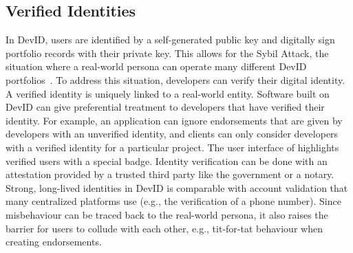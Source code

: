\subsection{Verified Identities}
\label{subsec:strong_identities}
In DevID, users are identified by a self-generated public key and digitally sign portfolio records with their private key.
This allows for the Sybil Attack, the situation where a real-world persona can operate many different DevID portfolios~\cite{douceur2002sybil}.
To address this situation, developers can verify their digital identity.
A verified identity is uniquely linked to a real-world entity.
Software built on DevID can give preferential treatment to developers that have verified their identity.
For example, an application can ignore endorsements that are given by developers with an unverified identity, and clients can only consider developers with a verified identity for a particular project.
The user interface of \Dappcoder{} highlights verified users with a special badge.
Identity verification can be done with an attestation provided by a trusted third party like the government or a notary.
Strong, long-lived identities in DevID is comparable with account validation that many centralized platforms use (e.g., the verification of a phone number).
Since misbehaviour can be traced back to the real-world persona, it also raises the barrier for users to collude with each other, e.g., tit-for-tat behaviour when creating endorsements.

